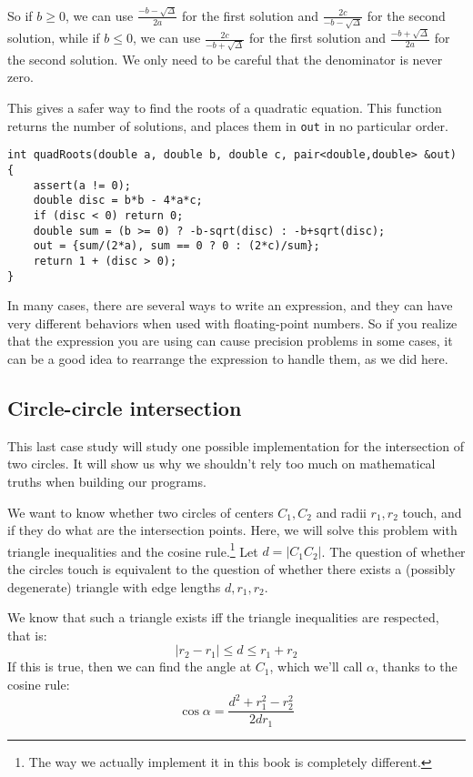 So if $b \geq 0$, we can use $\frac{-b-\sqrt{\Delta}}{2a}$ for the first solution and $\frac{2c}{-b-\sqrt{\Delta}}$ for the second solution, while if $b \leq 0$, we can use $\frac{2c}{-b+\sqrt{\Delta}}$ for the first solution and $\frac{-b+\sqrt{\Delta}}{2a}$ for the second solution. We only need to be careful that the denominator  is never zero.

This gives a safer way to find the roots of a quadratic equation. This function returns the number of solutions, and places them in \lstinline|out| in no particular order.
\begin{lstlisting}
int quadRoots(double a, double b, double c, pair<double,double> &out) {
    assert(a != 0);
    double disc = b*b - 4*a*c;
    if (disc < 0) return 0;
    double sum = (b >= 0) ? -b-sqrt(disc) : -b+sqrt(disc);
    out = {sum/(2*a), sum == 0 ? 0 : (2*c)/sum};
    return 1 + (disc > 0);
}
\end{lstlisting}

In many cases, there are several ways to write an expression, and they can have very different behaviors when used with floating-point numbers. So if you realize that the expression you are using can cause precision problems in some cases, it can be a good idea to rearrange the expression to handle them, as we did here.

\subsection{Circle-circle intersection}
This last case study will study one possible implementation for the intersection of two circles. It will show us why we shouldn't rely too much on mathematical truths when building our programs.

We want to know whether two circles of centers $C_1,C_2$ and radii $r_1,r_2$ touch, and if they do what are the intersection points. Here, we will solve this problem with triangle inequalities and the cosine rule.\footnote{The way we actually implement it in this book is completely different.} Let $d = |C_1C_2|$. The question of whether the circles touch is equivalent to the question of whether there exists a (possibly degenerate) triangle with edge lengths $d,r_1,r_2$.


We know that such a triangle exists iff the triangle inequalities are respected, that is:
\[|r_2-r_1| \leq d \leq r_1+r_2\]
If this is true, then we can find the angle at $C_1$, which we'll call $\alpha$, thanks to the cosine rule:
\[\cos\alpha = \frac{d^2+r_1^2-r_2^2}{2dr_1}\]


